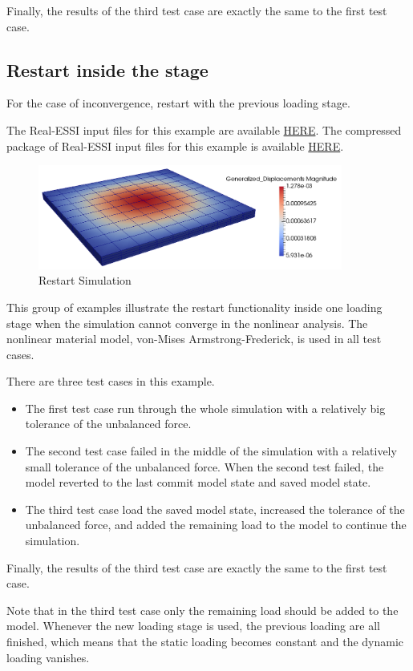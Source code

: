 Finally, the results of the third test case are exactly the same to the first test case.



\clearpage
\newpage
\subsection{ Restart inside the stage }
For the case of inconvergence, restart with the previous loading stage.

The Real-ESSI input files for this example are available 
\href{http://cml01.engr.ucdavis.edu/shortCourse/Day1/Restart_Simulation/in_stage}{HERE}. 
The compressed package of Real-ESSI input files for this example is available 
\href{http://cml01.engr.ucdavis.edu/shortCourse/Day1/Restart_Simulation/in_stage/in_stage.tgz}{HERE}. 

\begin{figure}[H]
  \centering
  \includegraphics[width = 10cm]{./Figure-files/Day1/Restart_Simulation/restart.png}
  \caption{Restart Simulation}
  \label{fig_restart_simulation2}
\end{figure}


This group of examples illustrate the restart functionality inside one loading stage 
when the simulation cannot converge in the nonlinear analysis.
The nonlinear material model, von-Mises Armstrong-Frederick, is used in all test cases.

There are three test cases in this example.
\begin{itemize}
  \item The first test case run through the whole simulation with a relatively big tolerance of the unbalanced force.
  \item The second test case failed in the middle of the simulation with a relatively small tolerance of the unbalanced force.
      When the second test failed, the model reverted to the last commit model state and saved model state.
  \item The third test case load the saved model state, increased the tolerance of the unbalanced force, and added the 
      remaining load to the model to continue the simulation.
\end{itemize}

Finally, the results of the third test case are exactly the same to the first test case.

Note that in the third test case only the remaining load should be added to the model. 
Whenever the new loading stage is used, the previous loading are all finished,
which means that the static loading becomes constant and the dynamic loading vanishes.





